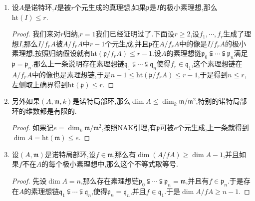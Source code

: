\begin{enumerate}
\begin{enumerate}
\begin{proof}
	    	归结为证明$n=2$的情况.假设$f\not\in\mathfrak{p}_1$,那么$f\not\in\mathfrak{p}_0$,设$\mathfrak{q}_1$是$\mathfrak{p}_0+fA$的包含在$\mathfrak{p}_2$中的极小素理想,那么$\mathfrak{p}_0\subsetneqq\mathfrak{q}_1$,倘若$\mathfrak{q}_1=\mathfrak{p}_2$,就导致$\mathfrak{q}_1$在$A/\mathfrak{p}_0$中的高度至少是2,和上一条结论矛盾,于是$\mathfrak{p}_1$满足要求.
	    \end{proof}
        \item 设$A$是诺特环,$I$是被$r$个元生成的真理想,如果$\mathfrak{p}$是$I$的极小素理想,那么$\mathrm{ht}(I)\le r$.
        \begin{proof}
        	
        	我们来对$r$归纳,$r=1$我们已经证明过了.下面设$r\ge2$,设$f_1,\cdots,f_r$生成了理想$I$,那么$I/f_rA$被$A/f_rA$中$r-1$个元生成,并且$\mathfrak{p}$在$A/f_rA$中的像是$I/f_rA$的极小素理想,按照归纳假设就有$\mathrm{ht}(\mathfrak{p}/f_rA)\le r-1$.设$A$的素理想链$\mathfrak{p}_0\subsetneqq\cdots\subsetneqq\mathfrak{p}_n$满足$\mathfrak{p}=\mathfrak{p}_n$.那么上一条说明存在素理想链$\mathfrak{q}_1\subsetneqq\cdots\subsetneqq\mathfrak{q}_n$使得$f_r\in\mathfrak{q}_1$,这个素理想链在$A/f_rA$中的像也是素理想链,于是$n-1\le\mathrm{ht}(\mathfrak{p}/f_rA)\le r-1$,于是得到$n\le r$,左侧取上确界得到$\mathrm{ht}(\mathfrak{p})\le r$.
        \end{proof}
        \item 另外如果$(A,\mathfrak{m},k)$是诺特局部环,那么$\dim A\le\dim_k\mathfrak{m}/\mathfrak{m}^2$,特别的诺特局部环的维数都是有限的.
        \begin{proof}
        	
        	如果记$e=\dim_k\mathfrak{m}/\mathfrak{m}^2$,按照NAK引理,有$\mathfrak{p}$可被$e$个元生成,上一条就得到$\dim A=\mathrm{ht}(\mathfrak{m})\le e$.
        \end{proof}
        \item 设$(A,\mathfrak{m})$是诺特局部环,设$f\in\mathfrak{m}$,那么有$\dim(A/fA)\ge\dim A-1$,并且如果$f$不在$A$的每个极小素理想中,那么这个不等式取等号.
        \begin{proof}
        	
        	先设$\dim A=n$,那么存在素理想链$\mathfrak{p}_0\subsetneqq\cdots\subsetneqq\mathfrak{p}_n=\mathfrak{m}$,并且有$f\in\mathfrak{p}_n$.于是存在$A$的素理想链$\mathfrak{q}_1\subsetneqq\cdots\subsetneqq\mathfrak{q}_n$,使得$\mathfrak{p}_n=\mathfrak{q}_n$,并且$f\in\mathfrak{q}_1$.于是$\dim A/fA\ge n-1$.
        	
        	\qquad
        	

\end{proof}
\end{enumerate}
\end{enumerate}
